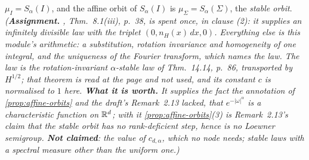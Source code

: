 \begin{lemma}
$\mu_I = S_\alpha(I)$, and the affine orbit of $S_\alpha(I)$ is $\mu_\Sigma = S_\alpha(\Sigma)$, the
\emph{stable orbit}.
\statusA\quad{}\quad\emph{(\textbf{Assignment.} , 
Thm.~8.1(iii), p.~38, is spent once, in clause (2): it supplies an infinitely divisible law with the
triplet $(0, n_H(x)\,dx, 0)$. Everything else is this module's arithmetic: a substitution, rotation
invariance and homogeneity of one integral, and the uniqueness of the Fourier transform, which names
the law. The law is the rotation-invariant $\alpha$-stable law of  Thm.~14.14,
p.~86, transported by $H^{1/2}$; that theorem is read at the page and not used, and its constant
$c$ is normalised to $1$ here. \textbf{What it is worth.} It supplies the fact the annotation of
\ref{prop:affine-orbits} and the draft's Remark~2.13 lacked, that $e^{-|\omega|^\alpha}$ is a
characteristic function on $\mathbb{R}^d$; with it \ref{prop:affine-orbits}(3) is Remark~2.13's claim that
the stable orbit has no rank-deficient step, hence is no Loewner semigroup. \textbf{Not claimed}:
the value of $c_{d,\alpha}$, which no node needs; stable laws with a spectral measure other than
the uniform one.)}
\end{lemma}

